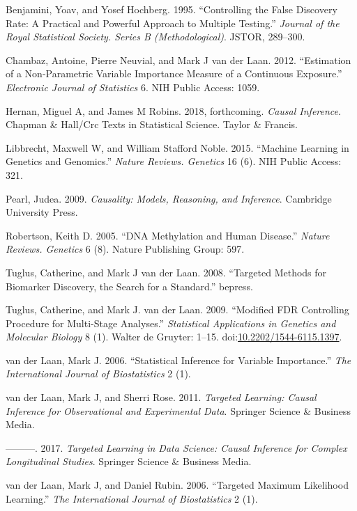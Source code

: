 \documentclass[9pt,a4paper,]{extarticle}
\theoremstyle{definition}
\theoremstyle{definition}
\theoremstyle{definition}
\theoremstyle{remark}
\begin{document}
\hypertarget{refs}{}
\hypertarget{ref-benjamini1995controlling}{}
Benjamini, Yoav, and Yosef Hochberg. 1995. ``Controlling the False
Discovery Rate: A Practical and Powerful Approach to Multiple Testing.''
\emph{Journal of the Royal Statistical Society. Series B
(Methodological)}. JSTOR, 289--300.

\hypertarget{ref-chambaz2012estimation}{}
Chambaz, Antoine, Pierre Neuvial, and Mark J van der Laan. 2012.
``Estimation of a Non-Parametric Variable Importance Measure of a
Continuous Exposure.'' \emph{Electronic Journal of Statistics} 6. NIH
Public Access: 1059.

\hypertarget{ref-hernan2018causal}{}
Hernan, Miguel A, and James M Robins. 2018, forthcoming. \emph{Causal
Inference}. Chapman \& Hall/Crc Texts in Statistical Science. Taylor \&
Francis.

\hypertarget{ref-libbrecht2015machine}{}
Libbrecht, Maxwell W, and William Stafford Noble. 2015. ``Machine
Learning in Genetics and Genomics.'' \emph{Nature Reviews. Genetics} 16
(6). NIH Public Access: 321.

\hypertarget{ref-pearl2009causality}{}
Pearl, Judea. 2009. \emph{Causality: Models, Reasoning, and Inference}.
Cambridge University Press.

\hypertarget{ref-robertson2005dna}{}
Robertson, Keith D. 2005. ``DNA Methylation and Human Disease.''
\emph{Nature Reviews. Genetics} 6 (8). Nature Publishing Group: 597.

\hypertarget{ref-tuglus2008targeted}{}
Tuglus, Catherine, and Mark J van der Laan. 2008. ``Targeted Methods for
Biomarker Discovery, the Search for a Standard.'' bepress.

\hypertarget{ref-tuglus2009modified}{}
Tuglus, Catherine, and Mark J. van der Laan. 2009. ``Modified FDR
Controlling Procedure for Multi-Stage Analyses.'' \emph{Statistical
Applications in Genetics and Molecular Biology} 8 (1). Walter de
Gruyter: 1--15.
doi:\href{https://doi.org/10.2202/1544-6115.1397}{10.2202/1544-6115.1397}.

\hypertarget{ref-vdl2006statistical}{}
van der Laan, Mark J. 2006. ``Statistical Inference for Variable
Importance.'' \emph{The International Journal of Biostatistics} 2 (1).

\hypertarget{ref-vdl2011targeted}{}
van der Laan, Mark J, and Sherri Rose. 2011. \emph{Targeted Learning:
Causal Inference for Observational and Experimental Data}. Springer
Science \& Business Media.

\hypertarget{ref-vdl2017targeted}{}
---------. 2017. \emph{Targeted Learning in Data Science: Causal
Inference for Complex Longitudinal Studies}. Springer Science \&
Business Media.

\hypertarget{ref-vdl2006targeted}{}
van der Laan, Mark J, and Daniel Rubin. 2006. ``Targeted Maximum
Likelihood Learning.'' \emph{The International Journal of Biostatistics}
2 (1).
\end{document}
